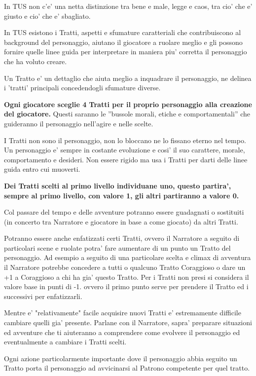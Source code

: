 \documentclass[a4paper,11pt,twoside,openany]{book}
\begin{document}
	In TUS non c'e' una netta distinzione tra bene e male, legge e caos, tra cio' che e' giusto e cio' che e' sbagliato.
	
	In TUS esistono i Tratti, aspetti e sfumature caratteriali che contribuiscono al background del personaggio, aiutano il giocatore a ruolare meglio e gli possono fornire quelle linee guida per interpretare in maniera piu' corretta il personaggio che ha voluto creare.
	
	Un Tratto e' un dettaglio che aiuta meglio a inquadrare il personaggio, ne delinea i 'tratti' principali concedendogli sfumature diverse.
	
	\textbf{Ogni giocatore sceglie 4 Tratti per il proprio personaggio alla creazione del giocatore.} Questi saranno le ''bussole morali, etiche e comportamentali'' che guideranno il personaggio nell'agire e nelle scelte.
	
	I Tratti non sono il personaggio, non lo bloccano ne lo fissano eterno nel tempo. Un personaggio e' sempre in costante evoluzione e cosi' il suo carattere, morale, comportamento e desideri. Non essere rigido ma usa i Tratti per darti delle linee guida entro cui muoverti.
	
	\textbf{Dei Tratti scelti al primo livello individuane uno, questo partira', sempre al primo livello, con valore 1, gli altri partiranno a valore 0.}
	
	Col passare del tempo e delle avventure potranno essere guadagnati o sostituiti (in concerto tra Narratore e giocatore in base a come giocato) da altri Tratti.
	
	Potranno essere anche enfatizzati certi Tratti, ovvero il Narratore a seguito di particolari scene e ruolate potra' fare aumentare di un punto un Tratto del personaggio. Ad esempio a seguito di una particolare scelta e climax di avventura il Narratore potrebbe concedere a tutti o qualcuno Tratto Coraggioso o dare un +1 a Coraggioso a chi ha gia' questo Tratto. Per i Tratti non presi si considera il valore base in punti di -1. ovvero il primo punto serve per prendere il Tratto ed i successivi per enfatizzarli.
	
	Mentre e' "relativamente" facile acquisire nuovi Tratti e' estremamente difficile cambiare quelli gia' presente. Parlane con il Narratore, sapra' preparare situazioni ed avventure che ti aiuteranno a comprendere come evolvere il personaggio ed eventualmente a cambiare i Tratti scelti.
	
	Ogni azione particolarmente importante dove il personaggio abbia seguito un Tratto porta il personaggio ad avvicinarsi al Patrono competente per quel tratto.
	
\end{document}
